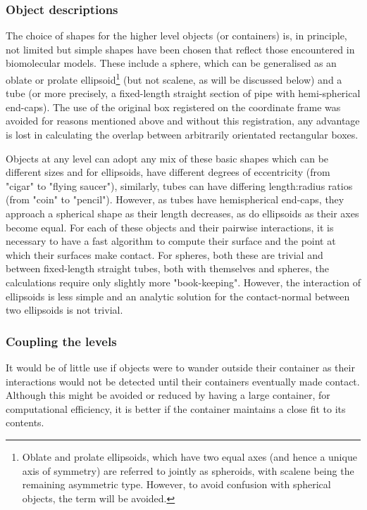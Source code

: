 \subsubsection{Object descriptions}
 
The choice of shapes for the higher level objects (or containers) is, in principle, not
limited but simple shapes have been chosen that reflect those encountered in biomolecular
models.   These include a sphere, which can be generalised as an oblate or prolate
ellipsoid\footnote{
Oblate and prolate ellipsoids, which have two equal axes (and hence a unique axis of symmetry)
are referred to jointly as spheroids, with scalene being the remaining asymmetric type.  
However, to avoid confusion with spherical objects, the term will be avoided.}
(but not scalene, as will be discussed below) and a tube (or more precisely, a fixed-length
straight section of pipe with hemi-spherical end-caps).   The use of the original box
registered on the coordinate frame was avoided for reasons mentioned above and without
this registration, any advantage is lost in calculating the overlap between arbitrarily
orientated rectangular boxes.

Objects at any level can adopt any mix of these basic shapes which can be different 
sizes and for ellipsoids, have different degrees of eccentricity (from "cigar" to "flying 
saucer"), similarly, tubes can have differing length:radius ratios (from "coin" to "pencil").
However, as tubes have hemispherical end-caps, they approach a spherical shape as their
length decreases, as do ellipsoids as their axes become equal.
For each of these objects and their pairwise interactions, it is necessary to have 
a fast algorithm to compute their surface and the point at which their surfaces
make contact.   For spheres, both these are trivial and between fixed-length straight
tubes, both with themselves and spheres, the calculations require only slightly more
"book-keeping".    However, the interaction of ellipsoids is less simple and an analytic
solution for the contact-normal between two ellipsoids is not trivial.

\subsubsection{Coupling the levels}

It would be of little use if objects were to wander outside their container as their
interactions would not be detected until their containers eventually made contact.
Although this might be avoided or reduced by having a large container, for computational
efficiency, it is better if the container maintains a close fit to its contents.

